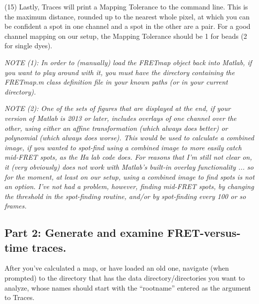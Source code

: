 \documentclass[11pt]{article}
\begin{document}
\noindent (15) Lastly, Traces will print a Mapping Tolerance to the command line.  This is the maximum distance, rounded up to the nearest whole pixel, at which you can be confident a spot in one channel and a spot in the other are a pair.  For a good channel mapping on our setup, the Mapping Tolerance should be 1 for beads (2 for single dyes).

{\it NOTE (1): In order to (manually) load the FRETmap object back into Matlab, if you want to play around with it, you must have the directory containing the FRETmap.m class definition file in your known paths (or in your current directory).}

{\it NOTE (2): One of the sets of figures that are displayed at the end, if your version of Matlab is 2013 or later, includes overlays of one channel over the other, using either an affine transformation (which always does better) or polynomial (which always does worse).  This would be used to calculate a combined image, if you wanted to spot-find using a combined image to more easily catch mid-FRET spots, as the Ha lab code does.  For reasons that I'm still not clear on, it (very obviously) does not work with Matlab's built-in overlay functionality ... so for the moment, at least on our setup, using a combined image to find spots is not an option. I've not had a problem, however, finding mid-FRET spots, by changing the threshold in the spot-finding routine, and/or by spot-finding every 100 or so frames.}

\subsection{Part 2: Generate and examine FRET-versus-time traces.}

After you've calculated a map, or have loaded an old one, navigate (when prompted) to the directory that has the data directory/directories you want to analyze, whose names should start with the ``rootname'' entered as the argument to Traces.
\end{document}

